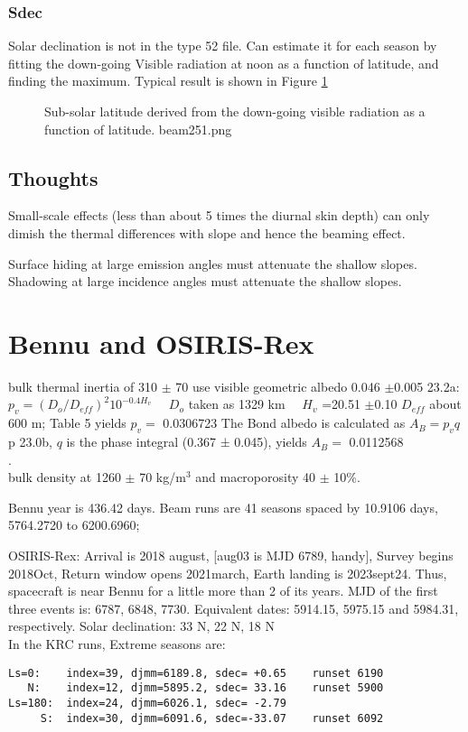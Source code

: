 \documentclass{article}
\begin{document}
\subsubsection{Sdec}
Solar declination is not in the type 52 file. Can estimate it for each season by
fitting the down-going Visible radiation at noon as a function of latitude, and
finding the maximum. Typical result is shown in Figure \ref{beam251}
\begin{figure}[!ht] 
\caption[Estimated sub-Solar Latitude]{Sub-solar latitude derived from the
  down-going visible radiation as a function of latitude.
\label{beam251}  beam251.png }
\end{figure} 


\subsection{Thoughts}

 Small-scale effects (less than about 5 times the diurnal skin depth) can only
 dimish the thermal differences with slope and hence the beaming effect.

Surface hiding at large emission angles must attenuate the shallow slopes. 
Shadowing at large incidence angles must attenuate the shallow slopes.

\section{Bennu and OSIRIS-Rex}  %

\qi bulk thermal inertia of 310 $\pm$ 70 \quti
\qi use visible geometric albedo  0.046  $\pm$0.005
\qii 23.2a: $p_v = ( D_o/ D_{eff})^2 10^{-0.4H_v}$  \ \ $D_o$ taken as 1329 km \ \ $H_v$ =20.51 $\pm$0.10
\qii $ D_{eff}$ about 600 m; Table 5
\qii yields $p_v=$ 0.0306723
\qi The Bond albedo is calculated as $A_B = p_v q$ 
\qii p 23.0b,  $q$ is the phase integral (0.367 ± 0.045),
\qii yields $A_B =$  0.0112568
\\ .
\\ 
\qi bulk density at 1260 $\pm$ 70 kg/m$^3$ and macroporosity 40 $\pm$ 10\%.

Bennu year is 436.42 days.  Beam runs are 41 seasons spaced by 10.9106 days,
5764.2720 to 6200.6960; 

\vspace{2.mm} OSIRIS-Rex: Arrival is 2018 august, [aug03 is MJD 6789, handy],
Survey begins 2018Oct, Return window opens 2021march, Earth landing is
2023sept24. Thus, spacecraft is near Bennu for a little more than 2 of its
years. MJD of the first three events is: 6787, 6848, 7730.
\qi Equivalent dates:  5914.15, 5975.15 and 5984.31, respectively.
\qi Solar declination: 33 N, 22 N, 18 N 
\\ In the KRC runs, Extreme seasons are:
\vspace{-3.mm} 
\begin{verbatim}
Ls=0:    index=39, djmm=6189.8, sdec= +0.65    runset 6190
   N:    index=12, djmm=5895.2, sdec= 33.16    runset 5900
Ls=180:  index=24, djmm=6026.1, sdec= -2.79 
     S:  index=30, djmm=6091.6, sdec=-33.07    runset 6092
\end{verbatim} 
\end{document}
